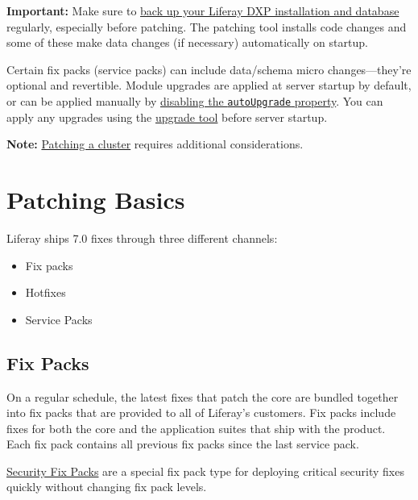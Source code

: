 \textbf{Important:} Make sure to
\href{/docs/7-0/deploy/-/knowledge_base/d/backing-up-a-liferay-installation}{back
up your Liferay DXP installation and database} regularly, especially
before patching. The patching tool installs code changes and some of
these make data changes (if necessary) automatically on startup.

Certain fix packs (service packs) can include data/schema micro
changes---they're optional and revertible. Module upgrades are applied
at server startup by default, or can be applied manually by
\href{/docs/7-0/deploy/-/knowledge_base/d/running-the-upgrade-process\#configuring-non-core-module-upgrades}{disabling
the \texttt{autoUpgrade} property}. You can apply any upgrades using the
\href{/docs/7-0/deploy/-/knowledge_base/d/upgrading-to-liferay-7}{upgrade
tool} before server startup.

\noindent\hrulefill

\noindent\hrulefill

\textbf{Note:}
\href{/docs/7-0/deploy/-/knowledge_base/d/updating-a-cluster}{Patching a
cluster} requires additional considerations.

\chapter{Patching Basics}\label{patching-basics}

Liferay ships 7.0 fixes through three different channels:

\begin{itemize}
\tightlist
\item
  Fix packs
\item
  Hotfixes
\item
  Service Packs
\end{itemize}

\section{Fix Packs}\label{fix-packs}

On a regular schedule, the latest fixes that patch the core are bundled
together into fix packs that are provided to all of Liferay's customers.
Fix packs include fixes for both the core and the application suites
that ship with the product. Each fix pack contains all previous fix
packs since the last service pack.

\href{https://help.liferay.com/hc/en-us/articles/360035038331}{Security
Fix Packs} are a special fix pack type for deploying critical security
fixes quickly without changing fix pack levels.

